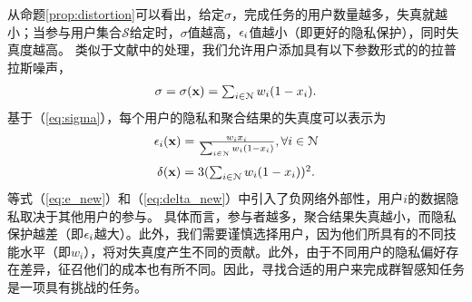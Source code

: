	\vspace{-0.2cm}
	从命题\ref{prop:distortion}可以看出，给定$\sigma$，完成任务的用户数量越多，失真就越小；当参与用户集合$\mathcal{S}$给定时，$\sigma$值越高，$\epsilon_i$值越小（即更好的隐私保护），同时失真度越高。
	类似于文献\cite{dandekar2014privacy}中的处理，我们允许用户添加具有以下参数形式的的拉普拉斯噪声，
	\begin{equation}\label{eq:sigma}
	\begin{array}
	[c]{lll}%
	\sigma=\sigma(\mathbf{x})=\sum_{i\in\N}w_i(1-x_i).
	\end{array}
	\end{equation}
	基于（\ref{eq:sigma}），每个用户的隐私和聚合结果的失真度可以表示为
	\begin{equation}\label{eq:e_new}
	\begin{array}
	[c]{lll}%
	\e_i(\mathbf{x})=\frac{w_ix_i}{\sum_{i\in\N}w_i(1-x_i)}, \forall i\in\N
	\end{array}
	\end{equation}
	\begin{equation}\label{eq:delta_new}
	\begin{array}
	[c]{lll}%
	\delta(\mathbf{x})=3(\sum_{i\in\N}w_i(1-x_i))^2.
	\end{array}
	\end{equation}
	等式（\ref{eq:e_new}）和（\ref{eq:delta_new}）中引入了{\kaishu 负网络外部性}，用户$i$的数据隐私取决于其他用户的参与。
	具体而言，参与者越多，聚合结果失真越小，而隐私保护越差（即$\epsilon_i$越大）。此外，我们需要谨慎选择用户，因为他们所具有的不同技能水平（即$w_i$），将对失真度产生不同的贡献。此外，由于不同用户的隐私偏好存在差异，征召他们的成本也有所不同。因此，寻找合适的用户来完成群智感知任务是一项具有挑战的任务。

